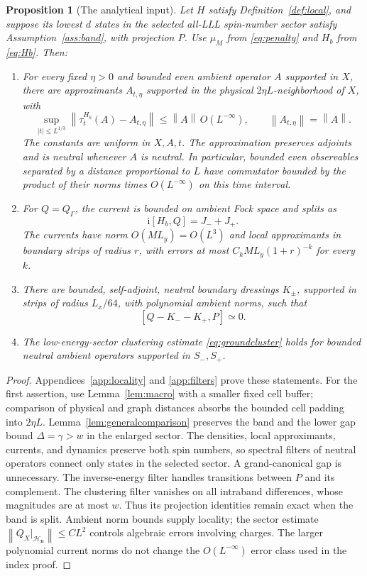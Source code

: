 \documentclass[11pt]{article}
\newtheorem{proposition}[theorem]{Proposition}
\theoremstyle{definition}
\theoremstyle{remark}
\newcommand{\ii}{\mathrm i}
\newcommand{\HH}{\mathcal H}
\newcommand{\eqL}{\simeq}
\newcommand{\norm}[1]{\left\lVert#1\right\rVert}
\begin{document}
\begin{proposition}[The analytical input]\label{prop:analytic}
Let \(H\) satisfy Definition~\ref{def:local}, and suppose its
lowest \(d\) states in the selected all-LLL spin-number sector
satisfy Assumption~\ref{ass:band}, with projection \(P\).
Use \(\mu_M\) from \eqref{eq:penalty} and \(H_b\) from
\eqref{eq:Hb}.  Then:
\begin{enumerate}
\item For every fixed \(\eta>0\) and bounded even ambient operator
\(A\) supported in \(X\), there are approximants \(A_{t,\eta}\)
supported in the physical \(2\eta L\)-neighborhood of \(X\), with
\[
 \sup_{|t|\le L^{1/3}}\norm{\tau_t^{H_b}(A)-A_{t,\eta}}
       \le\norm A\,O(L^{-\infty}),\qquad
 \norm{A_{t,\eta}}=\norm A.
\]
The constants are uniform in \(X,A,t\).  The approximation preserves
adjoints and is neutral whenever \(A\) is neutral.
In particular, bounded even observables separated by a distance
proportional to \(L\) have commutator bounded by the product of
their norms times \(O(L^{-\infty})\) on this time interval.
\item For \(Q=Q_\Gamma\), the current is bounded on ambient Fock
space and splits as
\[
 \ii[H_b,Q]=J_-+J_+.
\]
The currents have norm \(O(ML_y)=O(L^3)\) and local approximants
in boundary strips of radius \(r\), with errors at most
\(C_kML_y(1+r)^{-k}\) for every \(k\).
\item There are bounded, self-adjoint, neutral boundary dressings
\(K_\pm\), supported in strips of radius \(L_x/64\), with
polynomial ambient norms, such that
\[
 [Q-K_--K_+,P]\eqL0.
\]
\item The low-energy-sector clustering estimate
\eqref{eq:groundcluster} holds for bounded neutral ambient operators
supported in \(S_-,S_+\).
\end{enumerate}
\end{proposition}
\begin{proof}
Appendices~\ref{app:locality} and \ref{app:filters} prove these
statements.  For the first assertion, use Lemma~\ref{lem:macro}
with a smaller fixed cell buffer; comparison of physical and graph
distances absorbs the bounded cell padding into \(2\eta L\).
Lemma~\ref{lem:generalcomparison} preserves the band
and the lower gap bound \(\Delta=\gamma>w\) in the enlarged
sector.  The densities, local approximants, currents, and dynamics
preserve both spin numbers, so spectral filters of neutral operators
connect only states in the selected sector.  A grand-canonical gap
is unnecessary.  The inverse-energy filter handles transitions
between \(P\) and its complement.  The clustering filter vanishes
on all intraband differences, whose magnitudes are at most \(w\).
Thus its projection identities remain exact when the band is split.
Ambient norm bounds supply locality; the sector estimate
\(\norm{Q_X|_{\HH_{\bm n}}}\le CL^2\) controls algebraic errors
involving charges.  The larger polynomial current norms do not change
the \(O(L^{-\infty})\) error class used in the index proof.
\end{proof}
\end{document}
